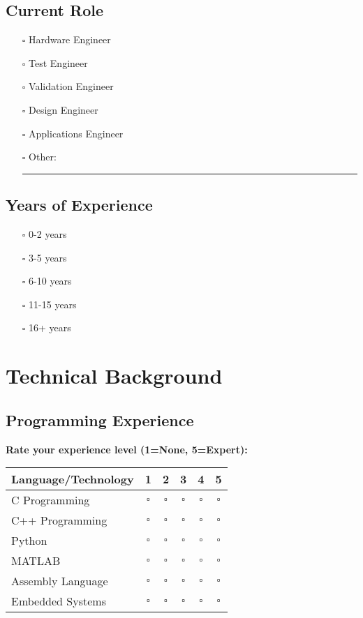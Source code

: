 \documentclass[11pt,a4paper]{article}
\begin{document}
\subsection{Current Role}
\begin{itemize}[leftmargin=0.5cm]
    \item[$\square$] Hardware Engineer
    \item[$\square$] Test Engineer
    \item[$\square$] Validation Engineer
    \item[$\square$] Design Engineer
    \item[$\square$] Applications Engineer
    \item[$\square$] Other: \rule{5cm}{0.4pt}
\end{itemize}

\subsection{Years of Experience}
\begin{itemize}[leftmargin=0.5cm]
    \item[$\square$] 0-2 years
    \item[$\square$] 3-5 years
    \item[$\square$] 6-10 years
    \item[$\square$] 11-15 years
    \item[$\square$] 16+ years
\end{itemize}

\section{Technical Background}

\subsection{Programming Experience}
\textbf{Rate your experience level (1=None, 5=Expert):}

\begin{tabular}{|l|c|c|c|c|c|}
\hline
\rowcolor{formgray}
\textbf{Language/Technology} & \textbf{1} & \textbf{2} & \textbf{3} & \textbf{4} & \textbf{5} \\
\hline
C Programming & $\square$ & $\square$ & $\square$ & $\square$ & $\square$ \\
\hline
C++ Programming & $\square$ & $\square$ & $\square$ & $\square$ & $\square$ \\
\hline
Python & $\square$ & $\square$ & $\square$ & $\square$ & $\square$ \\
\hline
MATLAB & $\square$ & $\square$ & $\square$ & $\square$ & $\square$ \\
\hline
Assembly Language & $\square$ & $\square$ & $\square$ & $\square$ & $\square$ \\
\hline
Embedded Systems & $\square$ & $\square$ & $\square$ & $\square$ & $\square$ \\
\hline
\end{tabular}
\end{document}
